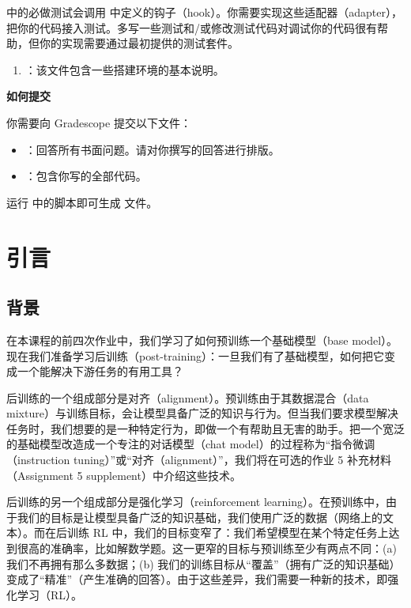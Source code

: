  中的必做测试会调用  中定义的钩子（hook）。你需要实现这些适配器（adapter），把你的代码接入测试。多写一些测试和/或修改测试代码对调试你的代码很有帮助，但你的实现需要通过最初提供的测试套件。

\begin{enumerate}
  \item {}：该文件包含一些搭建环境的基本说明。
\end{enumerate}

\noindent\textbf{如何提交}

你需要向 Gradescope 提交以下文件：

\begin{itemize}
  \item {}：回答所有书面问题。请对你撰写的回答进行排版。
  \item {}：包含你写的全部代码。
\end{itemize}

运行  中的脚本即可生成  文件。

\section{引言}

\subsection{背景}

在本课程的前四次作业中，我们学习了如何预训练一个基础模型（base model）。现在我们准备学习后训练（post-training）：一旦我们有了基础模型，如何把它变成一个能解决下游任务的有用工具？

后训练的一个组成部分是对齐（alignment）。预训练由于其数据混合（data mixture）与训练目标，会让模型具备广泛的知识与行为。但当我们要求模型解决任务时，我们想要的是一种特定行为，即做一个有帮助且无害的助手。把一个宽泛的基础模型改造成一个专注的对话模型（chat model）的过程称为“指令微调（instruction tuning）”或“对齐（alignment）”，我们将在可选的作业 5 补充材料（Assignment 5 supplement）中介绍这些技术。

后训练的另一个组成部分是强化学习（reinforcement learning）。在预训练中，由于我们的目标是让模型具备广泛的知识基础，我们使用广泛的数据（网络上的文本）。而在后训练 RL 中，我们的目标变窄了：我们希望模型在某个特定任务上达到很高的准确率，比如解数学题。这一更窄的目标与预训练至少有两点不同：(a) 我们不再拥有那么多数据；(b) 我们的训练目标从“覆盖”（拥有广泛的知识基础）变成了“精准”（产生准确的回答）。由于这些差异，我们需要一种新的技术，即强化学习（RL）。

